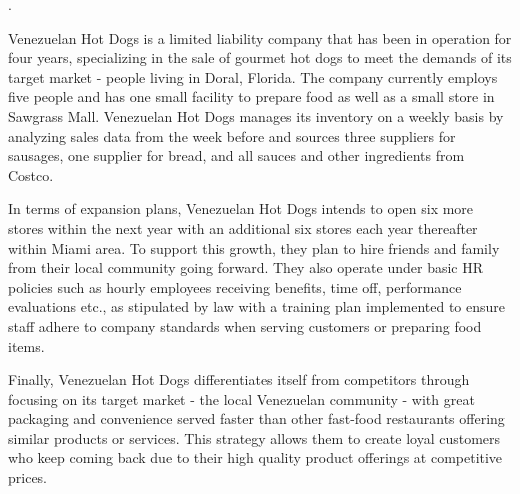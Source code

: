 . 

Venezuelan Hot Dogs is a limited liability company that has been in operation for four years, specializing in the sale of gourmet hot dogs to meet the demands of its target market - people living in Doral, Florida. The company currently employs five people and has one small facility to prepare food as well as a small store in Sawgrass Mall. Venezuelan Hot Dogs manages its inventory on a weekly basis by analyzing sales data from the week before and sources three suppliers for sausages, one supplier for bread, and all sauces and other ingredients from Costco. 

In terms of expansion plans, Venezuelan Hot Dogs intends to open six more stores within the next year with an additional six stores each year thereafter within Miami area. To support this growth, they plan to hire friends and family from their local community going forward. They also operate under basic HR policies such as hourly employees receiving benefits, time off, performance evaluations etc., as stipulated by law with a training plan implemented to ensure staff adhere to company standards when serving customers or preparing food items. 

Finally, Venezuelan Hot Dogs differentiates itself from competitors through focusing on its target market - the local Venezuelan community - with great packaging and convenience served faster than other fast-food restaurants offering similar products or services. This strategy allows them to create loyal customers who keep coming back due to their high quality product offerings at competitive prices.